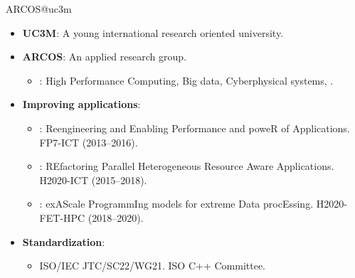 \begin{frame}{ARCOS@uc3m}
\begin{itemize}
  \item \textbf{UC3M}: A young international research oriented university.
  \vfill
  \item \textbf{ARCOS}: An applied research group.
    \begin{itemize}
      \item {}: 
            High Performance Computing,
            Big data,
            Cyberphysical systems,
            .
    \end{itemize} 
  \vfill
  \item \textbf{Improving applications}:
    \begin{itemize}
      \item {}: Reengineering and Enabling Performance and poweR of Applications.
            FP7-ICT (2013--2016).
      \item {}: REfactoring Parallel Heterogeneous Resource Aware Applications.
            H2020-ICT (2015--2018).
      \item {}: exAScale ProgrammIng models for extreme Data procEssing.
            H2020-FET-HPC (2018--2020).
    \end{itemize} 
  \vfill
  \item \textbf{Standardization}:
    \begin{itemize}
      \item ISO/IEC JTC/SC22/WG21. ISO C++ Committee.
    \end{itemize}
\end{itemize}
\end{frame}
